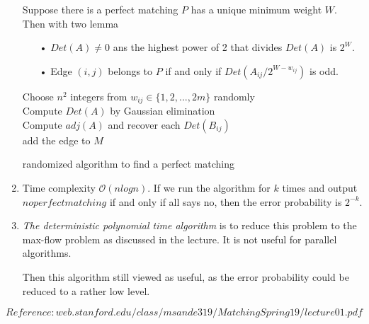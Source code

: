 \documentclass{assignment}
\begin{document}
\begin{homeworkProblem}
\begin{enumerate}
Suppose there is a perfect matching $P$ has a unique minimum weight $W$. Then with two lemma
\begin{enumerate}
\item[•] $Det(A) \neq 0$ ans the highest power of 2 that divides $Det(A)$ is $2^W$.
\item[•] Edge $(i,j)$ belongs to $P$ if and only if $Det(A_{ij} / 2^{W-w_{ij}})$ is odd. 
\end{enumerate}

\begin{algorithm}[H]
 \BlankLine
Choose $n^2$ integers from $w_{ij} \in \{ 1,2,...,2m \}$ randomly  \\
Compute $Det(A)$ by Gaussian elimination \\
Compute $adj(A)$ and recover each $Det(B_{ij})$ \\
 {
	 {
		add the edge to $M$ \\		
		}
}
\caption{randomized algorithm to find a perfect matching} \end{algorithm}

\item Time complexity $\mathcal{O}(nlogn)$. If we run the algorithm for $k$ times and output $no perfect matching$ if and only if all says no, then the error probability is $2^{-k}$. 
\item \textit{The deterministic polynomial time algorithm} is to reduce this problem to the max-flow problem as discussed in the lecture. It is not useful for parallel algorithms. 

Then this algorithm still viewed as useful, as the error probability could be reduced to a rather low level. 


	    \end{enumerate}
	    $Reference: web.stanford.edu/class/msande319/MatchingSpring19/lecture01.pdf$
	    \end{homeworkProblem}
	    
\end{document}
